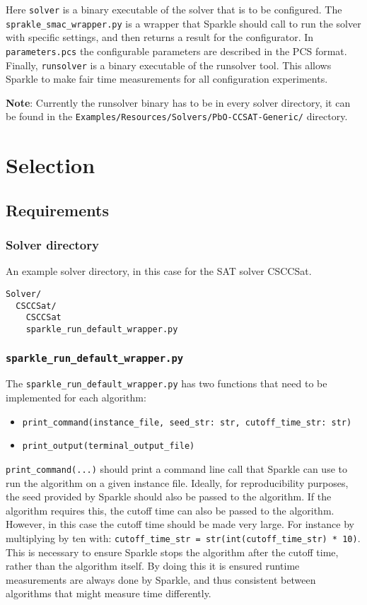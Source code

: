 \documentclass{article}
\begin{document}
Here \texttt{solver} is a binary executable of the solver that is to be configured. The \texttt{sprakle\_smac\_wrapper.py} is a wrapper that Sparkle should call to run the solver with specific settings, and then returns a result for the configurator. In \texttt{parameters.pcs} the configurable parameters are described in the PCS format. Finally, \texttt{runsolver} is a binary executable of the runsolver tool. This allows Sparkle to make fair time measurements for all configuration experiments.

\textbf{Note}: Currently the runsolver binary has to be in every solver directory, it can be found in the \texttt{Examples/Resources/Solvers/PbO-CCSAT-Generic/} directory. 

\section{Selection}

\subsection{Requirements}

\subsubsection{Solver directory}
An example solver directory, in this case for the SAT solver CSCCSat.
\begin{verbatim}
Solver/
  CSCCSat/
    CSCCSat
    sparkle_run_default_wrapper.py
\end{verbatim}

\subsubsection{\texttt{sparkle\_run\_default\_wrapper.py}}
The \texttt{sparkle\_run\_default\_wrapper.py} has two functions that need to be implemented for each algorithm:

\begin{itemize}[noitemsep]
  \item \texttt{print\_command(instance\_file, seed\_str: str, cutoff\_time\_str: str)}
  \item \texttt{print\_output(terminal\_output\_file)}
\end{itemize}

\texttt{print\_command(...)} should print a command line call that Sparkle can use to run the algorithm on a given instance file. Ideally, for reproducibility purposes, the seed provided by Sparkle should also be passed to the algorithm. If the algorithm requires this, the cutoff time can also be passed to the algorithm. However, in this case the cutoff time should be made very large. For instance by multiplying by ten with: \texttt{cutoff\_time\_str = str(int(cutoff\_time\_str) * 10)}. This is necessary to ensure Sparkle stops the algorithm after the cutoff time, rather than the algorithm itself. By doing this it is ensured runtime measurements are always done by Sparkle, and thus consistent between algorithms that might measure time differently.
\end{document}
